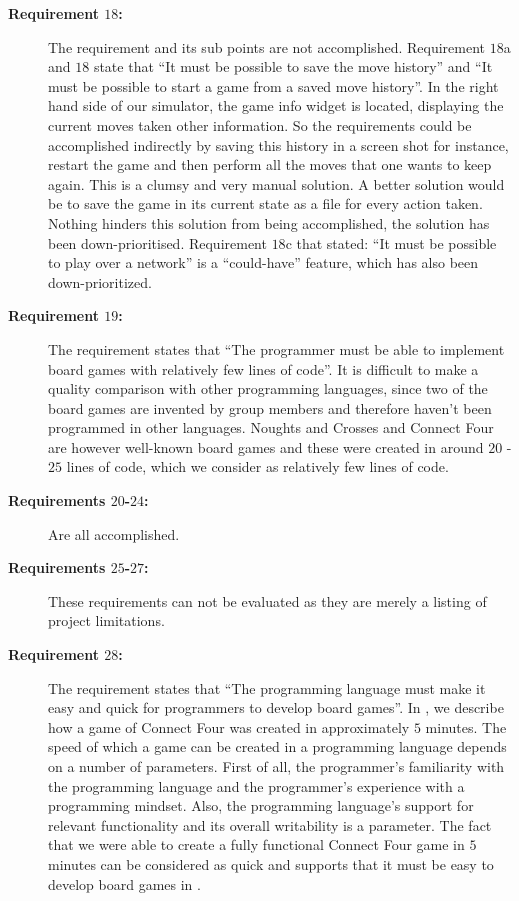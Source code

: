 \begin{description}
  \item[\textbf{Requirement $18$:}]
    The requirement and its sub points are not accomplished. Requirement
    $18$a and $18$ state that ``It must be possible to save the move
    history'' and ``It must be possible to start a game from a saved
    move history''. In the right hand side of our simulator, the game
    info widget is located, displaying the current moves taken other
    information. So the requirements could be accomplished indirectly by
    saving this history in a screen shot for instance, restart the game
    and then perform all the moves that one wants to keep again. This
    is a clumsy and very manual solution. A better solution would be to
    save the game in its current state as a file for every action taken.
    Nothing hinders this solution from being accomplished, the solution
    has been down-prioritised. Requirement $18$c that stated: ``It must
    be possible to play over a network'' is a ``could-have'' feature,
    which has also been down-prioritized.

  \item[\textbf{Requirement $19$:}]
    The requirement states that ``The programmer must be able to
    implement board games with relatively few lines of code''. It is difficult to
    make a quality comparison with other programming languages, since
    two of the board games are invented by group members and therefore
    haven't been programmed in other languages. Noughts and Crosses
    and Connect Four are however well-known board games and these were 
    created in around $20$ - $25$ lines of code, which we consider
    as relatively few lines of code.  

  \item[\textbf{Requirements $20$-$24$:}]
    Are all accomplished.

  \item[\textbf{Requirements $25$-$27$:}]
    These requirements can not be evaluated as they are merely a listing
    of project limitations.

  \item[\textbf{Requirement $28$:}]
    The requirement states that ``The programming language must make
    it easy and quick for programmers to develop board games''. In
    , we describe how a game of Connect Four
    was created in approximately $5$ minutes. The speed of which a
    game can be created in a programming language depends on a number
    of parameters. First of all, the programmer's familiarity with
    the programming language and the programmer's experience with a
    programming mindset. Also, the programming language's support for
    relevant functionality and its overall writability is a parameter.
    The fact that we were able to create a fully functional Connect Four
    game in $5$ minutes can be considered as quick and supports that it
    must be easy to develop board games in \productname{}.


\end{description}
